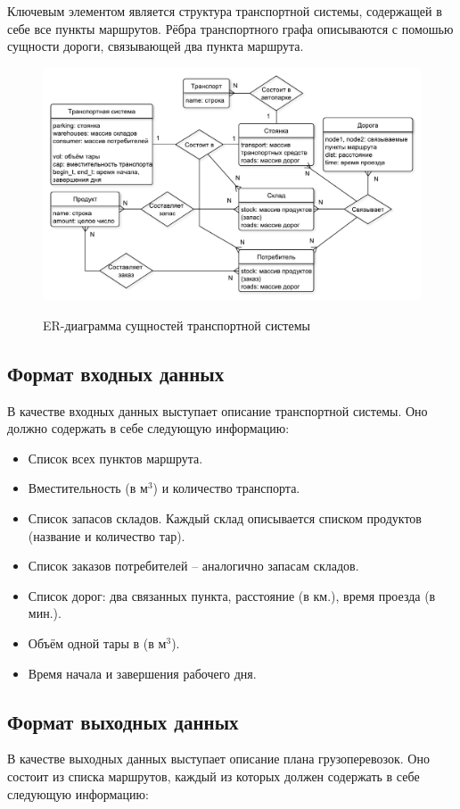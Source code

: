 Ключевым элементом является структура транспортной системы, содержащей в себе все пункты маршрутов. Рёбра транспортного графа описываются с помошью сущности дороги, связывающей два пункта маршрута.
\begin{figure}[h]
	\begin{center}
		{\includegraphics[scale=0.65, angle=0, page=1]{img/ER.pdf}}
		\caption{ER-диаграмма сущностей транспортной системы}
		\label{ER}
	\end{center}
\end{figure}

\subsection{Формат входных данных}
В качестве входных данных выступает описание транспортной системы. Оно должно содержать в себе следующую информацию:

\begin{itemize}
	\item Список всех пунктов маршрута.
	\item Вместительность (в м$^3$) и количество транспорта.
	\item Список запасов складов. Каждый склад описывается списком продуктов (название и количество тар).
	\item Список заказов потребителей -- аналогично запасам складов.
	\item Список дорог: два связанных пункта, расстояние (в км.), время проезда (в мин.).
	\item Объём одной тары в (в м$^3$).
	\item Время начала и завершения рабочего дня.
\end{itemize}

\subsection{Формат выходных данных}
В качестве выходных данных выступает описание плана грузоперевозок. Оно состоит из списка маршрутов, каждый из которых должен содержать в себе следующую информацию:

